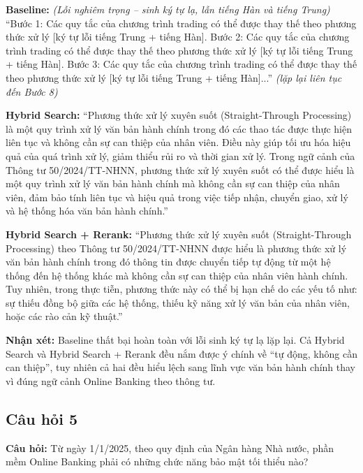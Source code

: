 \textbf{Baseline:} \textit{(Lỗi nghiêm trọng -- sinh ký tự lạ, lẫn tiếng Hàn và tiếng Trung)} ``Bước 1: Các quy tắc của chương trình trading có thể được thay thế theo phương thức xử lý [ký tự lỗi tiếng Trung + tiếng Hàn]. Bước 2: Các quy tắc của chương trình trading có thể được thay thế theo phương thức xử lý [ký tự lỗi tiếng Trung + tiếng Hàn]. Bước 3: Các quy tắc của chương trình trading có thể được thay thế theo phương thức xử lý [ký tự lỗi tiếng Trung + tiếng Hàn]...'' \textit{(lặp lại liên tục đến Bước 8)}

\textbf{Hybrid Search:} ``Phương thức xử lý xuyên suốt (Straight-Through Processing) là một quy trình xử lý văn bản hành chính trong đó các thao tác được thực hiện liên tục và không cần sự can thiệp của nhân viên. Điều này giúp tối ưu hóa hiệu quả của quá trình xử lý, giảm thiểu rủi ro và thời gian xử lý. Trong ngữ cảnh của Thông tư 50/2024/TT-NHNN, phương thức xử lý xuyên suốt có thể được hiểu là một quy trình xử lý văn bản hành chính mà không cần sự can thiệp của nhân viên, đảm bảo tính liên tục và hiệu quả trong việc tiếp nhận, chuyển giao, xử lý và hệ thống hóa văn bản hành chính.''

\textbf{Hybrid Search + Rerank:} ``Phương thức xử lý xuyên suốt (Straight-Through Processing) theo Thông tư 50/2024/TT-NHNN được hiểu là phương thức xử lý văn bản hành chính trong đó thông tin được chuyển tiếp tự động từ một hệ thống đến hệ thống khác mà không cần sự can thiệp của nhân viên hành chính. Tuy nhiên, trong thực tiễn, phương thức này có thể bị hạn chế do các yếu tố như: sự thiếu đồng bộ giữa các hệ thống, thiếu kỹ năng xử lý văn bản của nhân viên, hoặc các rào cản kỹ thuật.''

\textbf{Nhận xét:} Baseline thất bại hoàn toàn với lỗi sinh ký tự lạ lặp lại. Cả Hybrid Search và Hybrid Search + Rerank đều nắm được ý chính về ``tự động, không cần can thiệp'', tuy nhiên cả hai đều hiểu lệch sang lĩnh vực văn bản hành chính thay vì đúng ngữ cảnh Online Banking theo thông tư.

\subsection*{Câu hỏi 5}

\textbf{Câu hỏi:} Từ ngày 1/1/2025, theo quy định của Ngân hàng Nhà nước, phần mềm Online Banking phải có những chức năng bảo mật tối thiểu nào?

